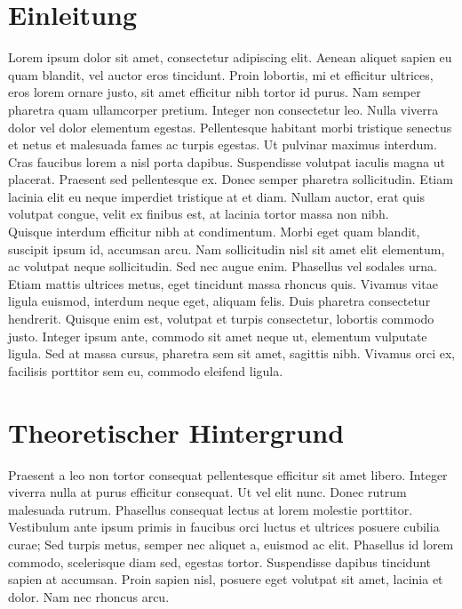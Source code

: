 

\def\semester{3}
\def\professor{Dr. Gerda Strutzenberger \& Lukas Neururer \& Dott. Mag. Yunus Schmirander}
\def\gruppe{BA-MGST-23-4D}
\def\datum{\today}
\def\verfasser{Dominic Vogt \& Florian Just \& Fabian Kocher \& Lukas Höpflinger}
\def\titel{Laborbericht 2 - Biosignalverarbeitung}






\section{Einleitung}
Lorem ipsum dolor sit amet, consectetur adipiscing elit. Aenean aliquet sapien eu quam blandit, vel auctor eros tincidunt. Proin lobortis, mi et efficitur ultrices, eros lorem ornare justo, sit amet efficitur nibh tortor id purus. Nam semper pharetra quam ullamcorper pretium. Integer non consectetur leo. Nulla viverra dolor vel dolor elementum egestas. Pellentesque habitant morbi tristique senectus et netus et malesuada fames ac turpis egestas. Ut pulvinar maximus interdum. Cras faucibus lorem a nisl porta dapibus. Suspendisse volutpat iaculis magna ut placerat. Praesent sed pellentesque ex. Donec semper pharetra sollicitudin. Etiam lacinia elit eu neque imperdiet tristique at et diam. Nullam auctor, erat quis volutpat congue, velit ex finibus est, at lacinia tortor massa non nibh.\\
Quisque interdum efficitur nibh at condimentum. Morbi eget quam blandit, suscipit ipsum id, accumsan arcu. Nam sollicitudin nisl sit amet elit elementum, ac volutpat neque sollicitudin. Sed nec augue enim. Phasellus vel sodales urna. Etiam mattis ultrices metus, eget tincidunt massa rhoncus quis. Vivamus vitae ligula euismod, interdum neque eget, aliquam felis. Duis pharetra consectetur hendrerit. Quisque enim est, volutpat et turpis consectetur, lobortis commodo justo. Integer ipsum ante, commodo sit amet neque ut, elementum vulputate ligula. Sed at massa cursus, pharetra sem sit amet, sagittis nibh. Vivamus orci ex, facilisis porttitor sem eu, commodo eleifend ligula.

\section{Theoretischer Hintergrund}
Praesent a leo non tortor consequat pellentesque efficitur sit amet libero. Integer viverra nulla at purus efficitur consequat. Ut vel elit nunc. Donec rutrum malesuada rutrum. Phasellus consequat lectus at lorem molestie porttitor. Vestibulum ante ipsum primis in faucibus orci luctus et ultrices posuere cubilia curae; Sed turpis metus, semper nec aliquet a, euismod ac elit. Phasellus id lorem commodo, scelerisque diam sed, egestas tortor. Suspendisse dapibus tincidunt sapien at accumsan. Proin sapien nisl, posuere eget volutpat sit amet, lacinia et dolor. Nam nec rhoncus arcu.

